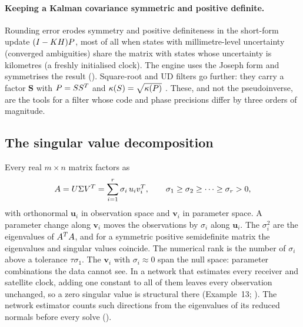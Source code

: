 \documentclass[main.tex]{subfiles}
\begin{document}
\paragraph{Keeping a Kalman covariance symmetric and positive definite.}
Rounding error erodes symmetry and positive definiteness in the short-form
update $(I - KH)P$, most of all when states with
millimetre-level uncertainty (converged ambiguities) share the matrix with
states whose uncertainty is kilometres (a freshly initialised clock).  The
engine uses the Joseph form and symmetrises the result
().  Square-root and UD filters go further: they carry a factor
$\bm{S}$ with $P = SS^{T}$ and
$\kappa(S) = \sqrt{\kappa(P)}$ \cite{bierman1977factorization}.
These, and not the pseudoinverse, are the tools for a filter whose code and
phase precisions differ by three orders of magnitude.

\subsection{The singular value decomposition}\label{sec:la-svd}

Every real $m \times n$ matrix factors as
\begin{equation}
A = U\Sigma V^{T} = \sum_{i=1}^{r}\sigma_i\,u_iv_i^{T},
\qquad
\sigma_1 \ge \sigma_2 \ge \dots \ge \sigma_r > 0,
\label{eq:la-svd}
\end{equation}
with orthonormal $\bm{u}_i$ in observation space and $\bm{v}_i$ in
parameter space.  A parameter change along $\bm{v}_i$ moves the
observations by $\sigma_i$ along $\bm{u}_i$.  The $\sigma_i^2$ are the
eigenvalues of $A^{T}A$, and for a symmetric positive
semidefinite matrix the eigenvalues and singular values coincide.  The
numerical rank is the number of $\sigma_i$ above a tolerance $\tau\sigma_1$.
The $\bm{v}_i$ with $\sigma_i \approx 0$ span the null space: parameter
combinations the data cannot see.  In a network that estimates every
receiver and satellite clock, adding one constant to all of them leaves
every observation unchanged, so a zero singular value is structural there
(Example~13; ).  The network estimator counts such directions from
the eigenvalues of its reduced normals before every solve
().
\end{document}
